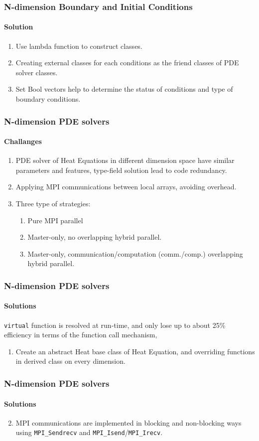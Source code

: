 \begin{frame}
  \frametitle{N-dimension Boundary and Initial Conditions}
  \framesubtitle{Solution}
  \begin{enumerate}
    \item Use lambda function to construct classes.
    \item Creating external classes for each conditions as the friend classes of PDE solver classes.
    \item Set Bool vectors help to determine the status of conditions and type of boundary conditions.
  \end{enumerate}
\end{frame}


\begin{frame}
  \frametitle{N-dimension PDE solvers}
  \framesubtitle{Challanges}
  \begin{enumerate}
    \item PDE solver of Heat Equations in different dimension space have similar parameters and features, type-field solution lead to code redundancy.
    \item Applying MPI communications between local arrays, avoiding overhead.
    \item Three type of strategies:
    \begin{enumerate}
      \item Pure MPI parallel
      \item Master-only, no overlapping hybrid parallel.
      \item Master-only, communication/computation (comm./comp.) overlapping hybrid parallel.
    \end{enumerate}
  \end{enumerate}
\end{frame}


\begin{frame}
  \frametitle{N-dimension PDE solvers}
  \framesubtitle{Solutions}
  \texttt{virtual} function is resolved at run-time, and only lose up to about 25\% efficiency in terms of the function call mechanism, 
  \begin{enumerate}
    \item Create an abstract Heat base class of Heat Equation, and overriding functions in derived class on every dimension.
  \end{enumerate}
\end{frame}


\begin{frame}
  \frametitle{N-dimension PDE solvers}
  \framesubtitle{Solutions}
  \begin{enumerate}
    \setcounter{enumi}{1}
    \item MPI communications are implemented in blocking and non-blocking ways using \texttt{MPI\_Sendrecv} and \texttt{MPI\_Isend}/\texttt{MPI\_Irecv}.
  \end{enumerate}
\end{frame}



